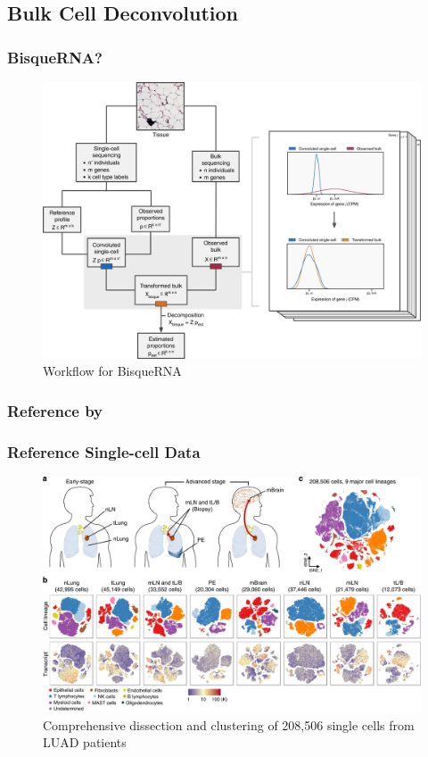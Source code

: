 \documentclass{beamer}
\begin{document}
    \subsection{Bulk Cell Deconvolution}
    \begin{frame}
        \frametitle{BisqueRNA?}

        \begin{figure}
            \includegraphics[width=0.6 \linewidth]{figures/Workflow/Bisque.jpg}
            \caption{Workflow for BisqueRNA \protect\cite{Bisque1}}
        \end{figure}
    \end{frame}

    \subsubsection{Reference by \protect{}}
    \begin{frame}
        \frametitle{Reference Single-cell Data}

        \begin{figure}
            \includegraphics[width=0.8 \linewidth]{figures/LungCancer/reference_1.jpg}
            \caption{Comprehensive dissection and clustering of 208,506 single cells from LUAD patients \protect\cite{singlecell1}}
        \end{figure}
    \end{frame}
\end{document}
